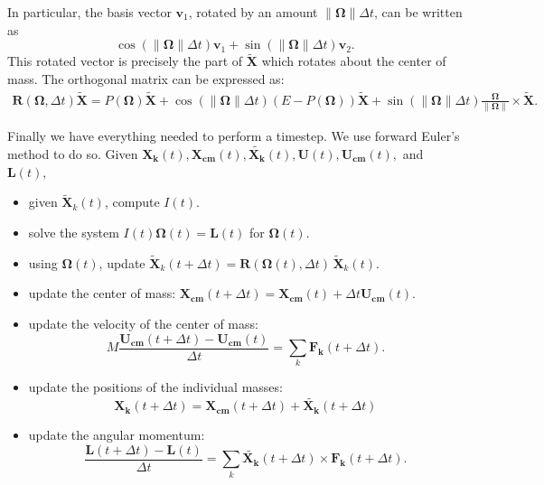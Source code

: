 \documentclass[12pt]{article}
\renewcommand{\(}{\left (}
\renewcommand{\)}{\right )}
\renewcommand{\vec}[1]{\boldsymbol{#1}}
\begin{document}
In particular, the basis vector $\vec{v}_1$, rotated by an amount $\|\vec{ \Omega}\|\Delta t$, can be written as
\begin{equation}
 \cos(\|\vec{\Omega}\|\Delta t)\vec{v}_1 + \sin(\|\vec{\Omega}\|\Delta t)\vec{v}_2.
\end{equation}
This rotated vector is precisely the part of $\widetilde{\vec{X}}$ which  rotates about the center of mass. The orthogonal matrix can be expressed as:
\begin{align}
{\vec{R}}(\vec{\Omega}, \Delta t) \widetilde{\vec{X}} = {P}({\vec{\Omega}}) \widetilde{\vec{X}} +  \cos(\|{\vec{ \Omega}}\|\Delta t) (E - { P}({\vec{ \Omega}})) \widetilde{\vec{X}} + \sin(\|{\vec{\Omega}}\|\Delta t) \frac{{\vec{\Omega}}}{\|{\vec {\Omega}}\|} \times \widetilde{\vec{X}}.
\end{align}

Finally we have everything needed to perform a timestep. We use forward Euler's method to do so. Given $\vec{X_k}(t), \vec{X_{cm}}(t), \vec{\widetilde{X_k}}(t), \vec{U}(t), \vec{U_{cm}}(t),$ and
$\vec{L}(t),$

\begin{itemize}

\item given $\widetilde{\vec{X}}_k(t)$, compute ${I}(t)$.
\item solve the system ${I}(t){\vec{\Omega}}(t) = \vec{ L}(t)$ for $\vec{\Omega}(t)$.
\item using $\vec{\Omega}(t)$, update $\widetilde{\vec{X}}_k(t + \Delta t) = \vec{R}({\vec{\Omega}}(t), \Delta t)\, \widetilde{\vec{X}}_k(t)$.
\item update the center of mass: $\vec{X_{cm}}(t + \Delta t) = \vec{ X_{cm}}(t) + \Delta t  \vec{U_{cm}}(t)$.
\item update the velocity of the center of mass:
\begin{equation*}
M \frac{\vec{U_{cm}}(t + \Delta t) - \vec{U_{cm}}(t)}{\Delta t} = \sum_k \vec{F_k}(t + \Delta t).
\end{equation*}
\item update the positions of the individual masses:
\begin{equation*}
\vec{X_k}(t+\Delta t) = \vec{X_{cm}}(t + \Delta t) + \widetilde{\vec{X_k}}(t+\Delta t)
\end{equation*}
\item update the angular momentum:
\begin{equation*}
    \frac{\vec{L}(t + \Delta t) - \vec{L}(t)}{\Delta t} = \sum_k \widetilde{\vec{X_k}}(t + \Delta t) \times \vec{F_k}(t + \Delta t).
\end{equation*}


\end{itemize}
\end{document}
